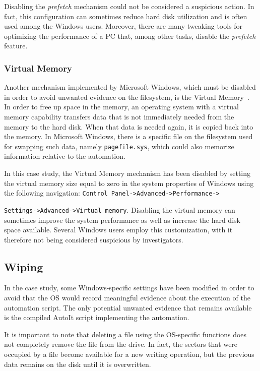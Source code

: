 \documentclass[runningheads]{llncs}
\begin{document}
Disabling the \emph{prefetch} mechanism could not be considered a suspicious action. In fact, this configuration can sometimes reduce hard disk utilization and is often used among the Windows users. Moreover, there are many tweaking tools for optimizing the performance of a PC that, among other tasks, disable the \emph{prefetch} feature.

\subsubsection{Virtual Memory}
Another mechanism implemented by Microsoft Windows, which must be disabled in order to avoid unwanted evidence on the filesystem, is the Virtual Memory~\cite{os}. In order to free up space in the memory, an operating system with a virtual memory capability transfers data that is not immediately needed from the memory to the hard disk. When that data is needed again, it is copied back into the memory. In Microsoft Windows, there is a specific file on the filesystem used for swapping such data, namely \verb=pagefile.sys=, which could also memorize information relative to the automation.

In this case study, the Virtual Memory mechanism has been disabled by setting the virtual memory size equal to zero in the system properties of Windows using the following navigation: {\verb=Control Panel->Advanced->Performance->=}

\noindent
{\verb=Settings->Advanced->Virtual memory=}.
Disabling the virtual memory can sometimes improve the system performance as well as increase the hard disk space available. Several Windows users employ this customization, with it therefore not being considered suspicious by investigators.

\subsection{Wiping}
\label{sub:wiping}
In the case study, some Windows-specific settings have been modified in order to avoid that the OS would record meaningful evidence about the execution of the automation script.
The only potential unwanted evidence that remains available is the compiled AutoIt script implementing the automation.

It is important to note that deleting a file using the OS-specific functions does not completely remove the file from the drive. In fact, the sectors that were occupied by a file become available for a new writing operation, but the previous data remains on the disk until it is overwritten.
\end{document}
